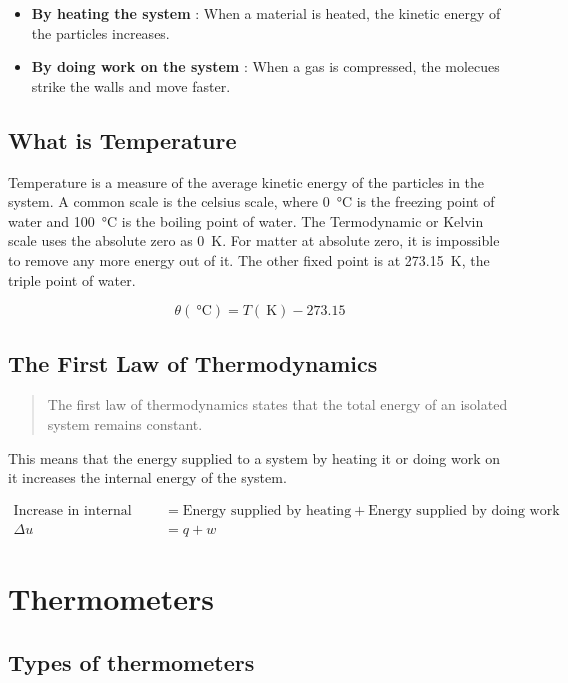\documentclass{scrbook}
\begin{document}
	\begin{itemize}
		\item
			\textbf{By heating the system} : When a material is heated, the kinetic energy of the particles increases.
		\item
			\textbf{By doing work on the system} : When a gas is compressed, the molecues strike the walls and move faster.
	\end{itemize}

\subsection{What is Temperature}

	Temperature is a measure of the average kinetic energy of the particles in the system. A common scale is the celsius scale, where \SI{0}{\celsius} is the freezing point of water and \SI{100}{\celsius} is the boiling point of water. The Termodynamic or Kelvin scale uses the absolute zero as \SI{0}{\kelvin}. For matter at absolute zero, it is impossible to remove any more energy out of it. The other fixed point is at \SI{273.15}{\kelvin}, the triple point of water.

	\[ \theta (\SI{}{\celsius}) = T (\SI{}{\kelvin}) -273.15 \]

\subsection{The First Law of Thermodynamics}

	\begin{quote}
		The first law of thermodynamics states that the total energy of an isolated system remains constant.
	\end{quote}

	This means that the energy supplied to a system by heating it or doing work on it increases the internal energy of the system.

	\begin{align*}
		\text{Increase in internal energy} &= \text{Energy supplied by heating} +  \text{Energy supplied by doing work} \\
		\Delta u &= q + w
	\end{align*}

\section{Thermometers}

\subsection{Types of thermometers}
\end{document}
